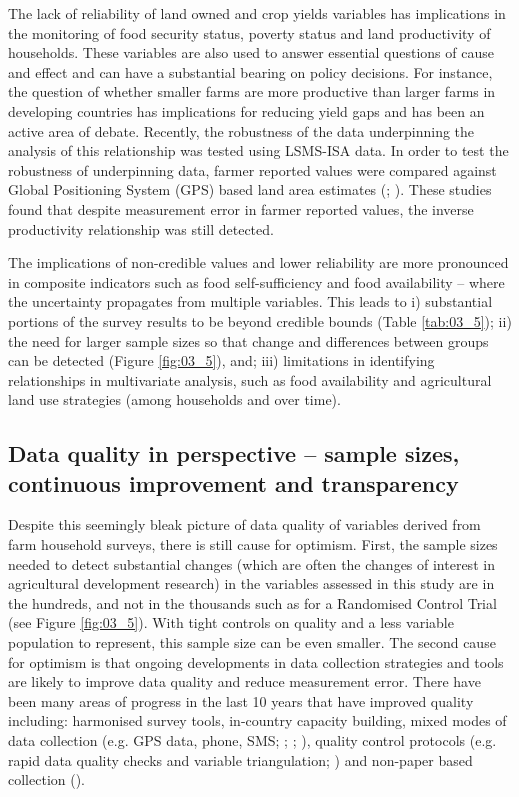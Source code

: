 The lack of reliability of land owned and crop yields variables has implications in the monitoring of food security status, poverty status and land productivity of households. These variables are also used to answer essential questions of cause and effect and can have a substantial bearing on policy decisions. For instance, the question of whether smaller farms are more productive than larger farms in developing countries has implications for reducing yield gaps and has been an active area of debate. Recently, the robustness of the data underpinning the analysis of this relationship was tested using LSMS-ISA data. In order to test the robustness of underpinning data, farmer reported values were compared against Global Positioning System (GPS) based land area estimates (\citealp{Kilic2013}; \citealp{Carletto2011}). These studies found that despite measurement error in farmer reported values, the inverse productivity relationship was still detected.

The implications of non-credible values and lower reliability are more pronounced in composite indicators such as food self-sufficiency and food availability -- where the uncertainty propagates from multiple variables. This leads to i) substantial portions of the survey results to be beyond credible bounds (Table \ref{tab:03_5}); ii) the need for larger sample sizes so that change and differences between groups can be detected (Figure \ref{fig:03_5}), and; iii) limitations in identifying relationships in multivariate analysis, such as food availability and agricultural land use strategies (among households and over time).

\subsection{Data quality in perspective -- sample sizes, continuous improvement and transparency}

Despite this seemingly bleak picture of data quality of variables derived from farm household surveys, there is still cause for optimism. First, the sample sizes needed to detect substantial changes (which are often the changes of interest in agricultural development research) in the variables assessed in this study are in the hundreds, and not in the thousands such as for a Randomised Control Trial (see Figure \ref{fig:03_5}). With tight controls on quality and a less variable population to represent, this sample size can be even smaller. The second cause for optimism is that ongoing developments in data collection strategies and tools are likely to improve data quality and reduce measurement error. There have been many areas of progress in the last 10 years that have improved quality including: harmonised survey tools, in-country capacity building, mixed modes of data collection (e.g. GPS data, phone, SMS; \citealp{Carletto2016}; \citealp{Deininger2011}; \citealp{Leeuw2005}), quality control protocols (e.g. rapid data quality checks and variable triangulation; \citealp{Fisher2010}) and non-paper based collection (\citealp{Rosenstock2017}).

